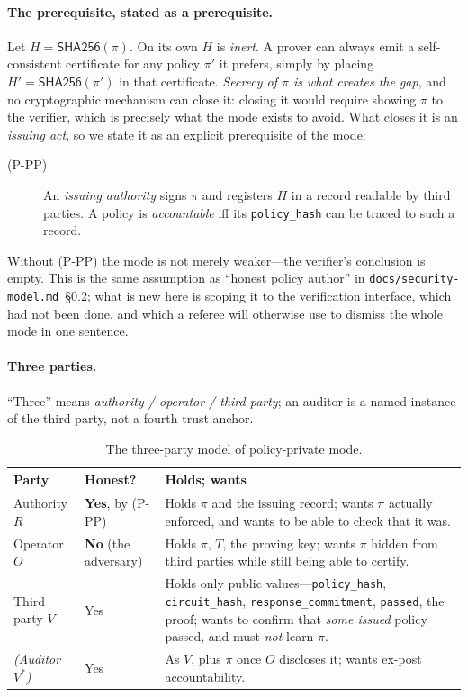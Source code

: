 \documentclass[journal]{IEEEtran}
\begin{document}
\paragraph{The prerequisite, stated as a prerequisite.} Let
$H = \mathsf{SHA256}(\pi)$. On its own $H$ is \emph{inert}. A prover can always
emit a self-consistent certificate for any policy $\pi'$ it prefers, simply by
placing $H' = \mathsf{SHA256}(\pi')$ in that certificate. \emph{Secrecy of
$\pi$ is what creates the gap}, and no cryptographic mechanism can close it:
closing it would require showing $\pi$ to the verifier, which is precisely what
the mode exists to avoid. What closes it is an \emph{issuing act}, so we state
it as an explicit prerequisite of the mode:

\begin{description}
  \item[(P-PP)] An \emph{issuing authority} signs $\pi$ and registers $H$ in a
  record readable by third parties. A policy is \emph{accountable} iff its
  \texttt{policy\_hash} can be traced to such a record.
\end{description}

Without (P-PP) the mode is not merely weaker---the verifier's conclusion is
empty. This is the same assumption as ``honest policy author'' in
\texttt{docs/security-model.md}~\S0.2; what is new here is scoping it to the
verification interface, which had not been done, and which a referee will
otherwise use to dismiss the whole mode in one sentence.

\paragraph{Three parties.} ``Three'' means \emph{authority / operator / third
party}; an auditor is a named instance of the third party, not a fourth trust
anchor.

\begin{table}[t]
\centering
\caption{The three-party model of policy-private mode.}
\label{tab:wp4-parties}
\setlength{\tabcolsep}{3pt}
\begin{tabular}{@{}L{0.15\columnwidth}L{0.13\columnwidth}L{0.64\columnwidth}@{}}
\toprule
Party & Honest? & Holds; wants \\
\midrule
Authority $R$ & \textbf{Yes}, by (P-PP) & Holds $\pi$ and the issuing record;
wants $\pi$ actually enforced, and wants to be able to check that it was. \\
Operator $O$ & \textbf{No} (the adversary) & Holds $\pi$, $T$, the proving key;
wants $\pi$ hidden from third parties while still being able to certify. \\
Third party $V$ & Yes & Holds only public values---\texttt{policy\_\allowbreak hash},
\texttt{circuit\_\allowbreak hash}, \texttt{response\_\allowbreak commitment}, \texttt{passed}, the
proof; wants to confirm that \emph{some issued} policy passed, and must
\emph{not} learn $\pi$. \\
\emph{(Auditor $V^{*}$)} & Yes & As $V$, plus $\pi$ once $O$ discloses it;
wants ex-post accountability. \\
\bottomrule
\end{tabular}
\end{table}
\end{document}
